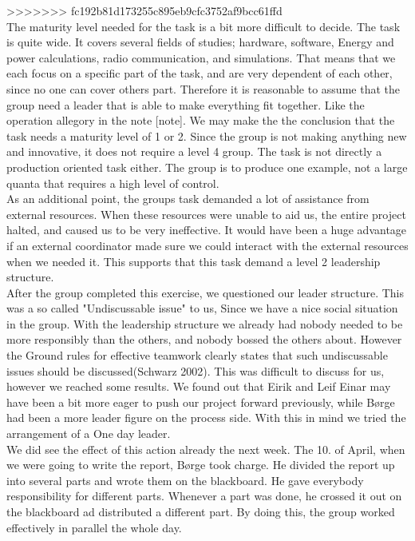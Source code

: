 >>>>>>> fc192b81d173255c895eb9cfc3752af9bcc61ffd
\\	
The maturity level needed for the task is a bit more difficult to decide. The task is quite wide. It covers several fields of studies; hardware, software, Energy and power calculations, radio communication, and simulations. That means that we each focus on a specific part of the task, and are very dependent of each other, since no one can cover others part. Therefore it is reasonable to assume that the group need a leader that is able to make everything fit together. Like the operation allegory in the note [note]. We may make the the conclusion that the task needs a maturity level of 1 or 2. Since the group is not making anything new and innovative, it does not require a level 4 group. The task is not directly a production oriented task either. The group is to produce one example, not a large quanta that requires a high level of control. 
\\
As an additional point, the groups task demanded a lot of assistance from external resources. When these resources were unable to aid us, the entire project halted, and caused us to be very ineffective. It would have been a huge advantage if an external coordinator made sure we could interact with the external resources when we needed it. This supports that this task demand a level 2 leadership structure.
\\
After the group completed this exercise, we questioned our leader structure. This was a so called "Undiscussable issue" to us, Since we have a nice social situation in the group. With the leadership structure we already had nobody needed to be more responsibly than the others, and nobody bossed the others about. However the Ground rules for effective teamwork clearly states that such undiscussable issues should be discussed(Schwarz 2002). This was difficult to discuss for us, however we reached some results. We found out that Eirik and Leif Einar may have been a bit more eager to push our project forward previously, while Børge had been a more leader figure on the process side. With this in mind we tried the arrangement of a One day leader. 
\\
We did see the effect of this action already the next week. The 10. of April, when we were going to write the report, Børge took charge. He divided the report up into several parts and wrote them on the blackboard. He gave everybody responsibility for different parts. Whenever a part was done, he crossed it out on the blackboard ad distributed a different part. By doing this, the group worked effectively in parallel the whole day. 
